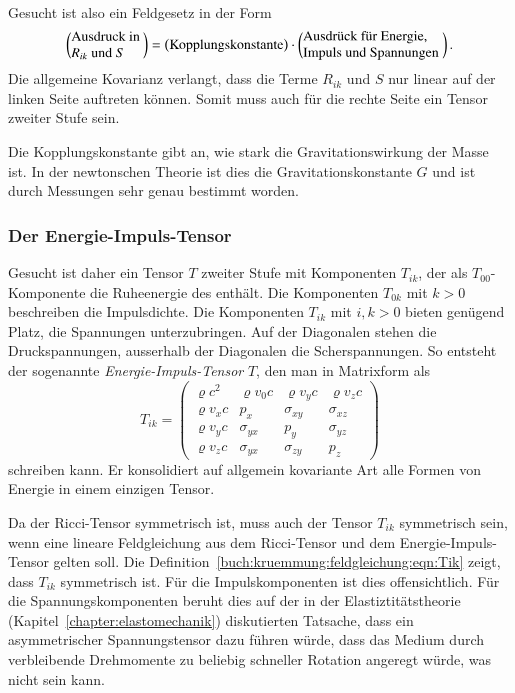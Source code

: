 Gesucht ist also ein Feldgesetz in der Form
\begin{equation}
\left(
\begin{minipage}{1.8cm}
\raggedright
Ausdruck in $R_{ik}$ und $S$
\end{minipage}
\right)
=
\left(
\text{Kopplungskonstante}
\right)
\cdot
\left(
\begin{minipage}{3.5cm}
\raggedright
Ausdrück für Energie, Impuls und Spannungen
\end{minipage}
\right).
\label{buch:kruemmung:feldgleichungen:eqn:schema}
\end{equation}
Die allgemeine Kovarianz verlangt, dass die Terme $R_{ik}$ und $S$
nur linear auf der linken Seite auftreten können.
Somit muss auch für die rechte Seite ein Tensor zweiter Stufe sein.

Die Kopplungskonstante gibt an, wie stark die Gravitationswirkung
der Masse ist. 
In der newtonschen Theorie ist dies die Gravitationskonstante $G$
und ist durch Messungen sehr genau bestimmt worden.

%
%
\subsubsection{Der Energie-Impuls-Tensor}
Gesucht ist daher ein Tensor $T$ zweiter Stufe mit Komponenten
$T_{ik}$, der als $T_{00}$-Kompo\-nen\-te die Ruheenergie des enthält.
Die Komponenten $T_{0k}$ mit $k>0$ beschreiben die Impulsdichte.
Die Komponenten $T_{ik}$ mit $i,k>0$ bieten genügend Platz, die
Spannungen unterzubringen.
Auf der Diagonalen stehen die Druckspannungen, ausserhalb der Diagonalen
die Scherspannungen.
So entsteht der sogenannte \emph{Energie-Impuls-Tensor} $T$,
den man in Matrixform als
\begin{equation}
T_{ik}
=
\begin{pmatrix}
\varrho     c^2 & \varrho v_0 c & \varrho v_y c & \varrho v_z c \\
\varrho v_x c   & p_x           & \sigma_{xy}   & \sigma_{xz}   \\
\varrho v_y c   & \sigma_{yx}   & p_y           & \sigma_{yz}   \\
\varrho v_z c   & \sigma_{yx}   & \sigma_{zy}   & p_z
\end{pmatrix}
\label{buch:kruemmung:feldgleichung:eqn:Tik}
\end{equation}
schreiben kann.
Er konsolidiert auf allgemein kovariante Art alle Formen von Energie
in einem einzigen Tensor.

Da der Ricci-Tensor symmetrisch ist, muss auch der Tensor $T_{ik}$
symmetrisch sein, wenn eine lineare Feldgleichung aus dem Ricci-Tensor
und dem Energie-Impuls-Tensor gelten soll.
Die Definition~\eqref{buch:kruemmung:feldgleichung:eqn:Tik} zeigt,
dass $T_{ik}$ symmetrisch ist.
Für die Impulskomponenten ist dies offensichtlich.
Für die Spannungskomponenten beruht dies auf der in der
Elastiztitätstheorie (Kapitel~\ref{chapter:elastomechanik})
diskutierten Tatsache, dass ein asymmetrischer Spannungstensor dazu
führen würde, dass das Medium durch verbleibende Drehmomente zu
beliebig schneller Rotation angeregt würde, was nicht sein kann.

